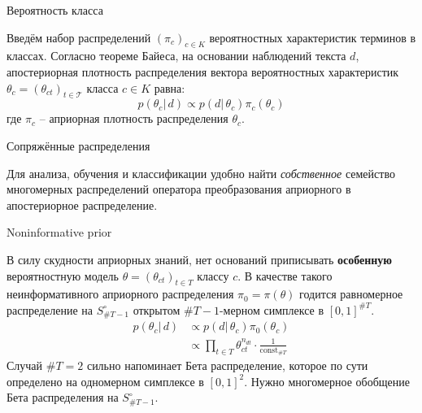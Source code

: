 \documentclass{beamer}
\newcommand{\eng}[1]{\foreignlanguage{english}{#1}}
\newcommand{\clo}[1]{\left [ #1 \right ]}
\newcommand{\brac}[1]{\left ( #1 \right )}
\newcommand{\induc}[1]{\left . #1 \right \vert}
\newcommand{\Tcal}{\mathcal{T}}
\begin{document}
\begin{frame}
  \begin{block}{Вероятность класса}

    Введём набор распределений $\brac{\pi_c}_{c\in K}$ вероятностных характеристик терминов в классах.
    Согласно теореме Байеса, на основании наблюдений текста $d$, апостериорная плотность распределения вектора вероятностных характеристик $\theta_c = \brac{\theta_{ct}}_{t\in \Tcal}$ класса $c\in K$ равна:
      \[p\brac{\induc{\theta_c}\,d} \propto p\brac{\induc{d}\,\theta_c}\pi_c(\theta_c)\]
    где $\pi_c$ -- априорная плотность распределения $\theta_c$.
  \end{block}
  \begin{block}{Сопряжённые распределения}

    Для анализа, обучения и классификации удобно найти \emph{собственное} семейство многомерных распределений оператора преобразования априорного в апостериорное распределение.
  \end{block}
\end{frame}

\begin{frame}
  \begin{block}{\eng{Noninformative prior}}

    В силу скудности априорных знаний, нет оснований приписывать \textbf{особенную} вероятностную модель $\theta = \brac{\theta_{ct}}_{t\in T}$ классу $c$.
    В качестве такого неинформативного априорного распределения $\pi_0=\pi(\theta)$ годится равномерное распределение на $S_{\#T-1}^\circ$ открытом $\#T-1$-мерном симплексе в $\clo{0,1}^{\#T}$.
    \begin{align*}
      p\brac{\induc{\theta_c}\,d} & \propto p\brac{\induc{d}\,\theta_c}\pi_0(\theta_c) \\
        & \propto \prod_{t\in T}\theta_{ct}^{n_{dt}} \cdot \frac{1}{\text{const}_{\#T}}
    \end{align*}
    Случай $\#T=2$ сильно напоминает Бета распределение, которое по сути определено на одномерном симплексе в $\clo{0,1}^2$.
    Нужно многомерное обобщение Бета распределения на $S_{\#T-1}^\circ$.
  \end{block}
\end{frame}
\end{document}
